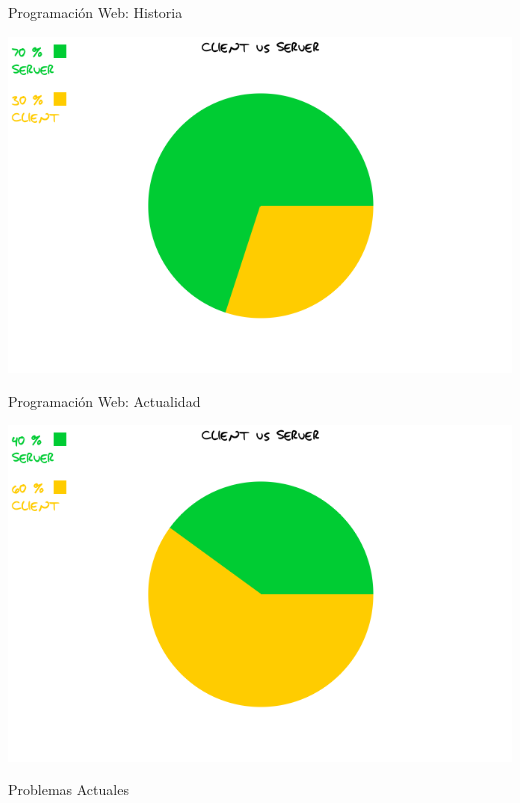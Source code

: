 \documentclass[xcolor=dvipsnames, 14pt]{beamer}
\begin{document}
\begin{frame}{Programación Web: Historia}
    \begin{center}
        \includegraphics[width=\textwidth]{img/historia.png}
    \end{center}
\end{frame}

\begin{frame}{Programación Web: Actualidad}
    \begin{center}
        \includegraphics[width=\textwidth]{img/actualidad.png}
    \end{center}
\end{frame}

\begin{frame}{Problemas Actuales}
\end{frame}
\end{document}
